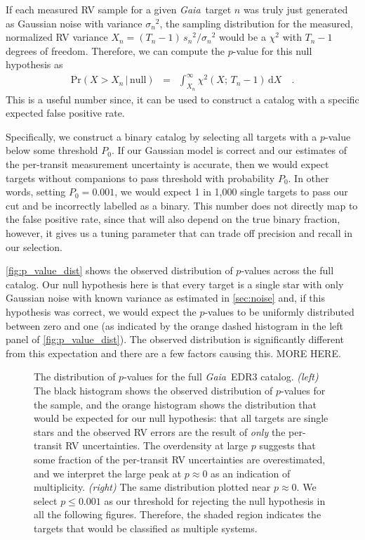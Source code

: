 \documentclass[modern, letterpaper]{aastex63}
\newcommand{\project}[1]{\textsl{#1}}
\newcommand{\Gaia}{\project{Gaia}}
\newcommand{\dd}{\ensuremath{\,\mathrm{d}}}
\begin{document}
If each measured RV sample for a given \Gaia\ target $n$ was truly just generated as Gaussian noise with variance ${\sigma_n}^2$, the sampling distribution for the measured, normalized RV variance $X_n = (T_n - 1)\,{s_n}^2 / {\sigma_n}^2$ would be a $\chi^2$ with $T_n - 1$ degrees of freedom.
Therefore, we can compute the $p$-value for this null hypothesis as
\begin{eqnarray}
	\mathrm{Pr}(X > X_n\,|\,\mathrm{null}) &=& \int_{X_n}^\infty \chi^2 (X;\,T_n-1) \dd X \quad.
\end{eqnarray}
This is a useful number since, it can be used to construct a catalog with a specific expected false positive rate.

Specifically, we construct a binary catalog by selecting all targets with a $p$-value below some threshold $P_0$.
If our Gaussian model is correct and our estimates of the per-transit measurement uncertainty is accurate, then we would expect targets without companions to pass threshold with probability $P_0$.
In other words, setting $P_0 = 0.001$, we would expect 1 in 1,000 single targets to pass our cut and be incorrectly labelled as a binary.
This number does not directly map to the false positive rate, since that will also depend on the true binary fraction, however, it gives us a tuning parameter that can trade off precision and recall in our selection.

\autoref{fig:p_value_dist} shows the observed distribution of $p$-values across the full catalog.
Our null hypothesis here is that every target is a single star with only Gaussian noise with known variance as estimated in \autoref{sec:noise} and, if this hypothesis was correct, we would expect the $p$-values to be uniformly distributed between zero and one (as indicated by the orange dashed histogram in the left panel of \autoref{fig:p_value_dist}).
The observed distribution is significantly different from this expectation and there are a few factors causing this.
MORE HERE.

\begin{figure}
	\caption{The distribution of $p$-values for the full \Gaia\ EDR3 catalog.
		\emph{(left)} The black histogram shows the observed distribution of $p$-values for the sample, and the orange histogram shows the distribution that would be expected for our null hypothesis: that all targets are single stars and the observed RV errors are the result of \emph{only} the per-transit RV uncertainties.
		The overdensity at large $p$ suggests that some fraction of the per-transit RV uncertainties are overestimated, and we interpret the large peak at $p \approx 0$ as an indication of multiplicity.
		\emph{(right)} The same distribution plotted near $p \approx 0$.
		We select $p \leq 0.001$ as our threshold for rejecting the null hypothesis in all the following figures.
		Therefore, the shaded region indicates the targets that would be classified as multiple systems.
		\label{fig:p_value_dist}}
\end{figure}
\end{document}

